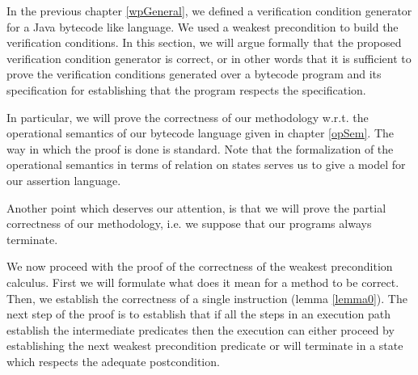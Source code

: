  In the previous chapter \ref{wpGeneral}, we defined a verification
 condition generator for a Java bytecode like language. We used a weakest precondition
 to build the verification conditions. In this section, we will argue formally that the
 proposed verification condition generator is correct, or in other words that it is sufficient
 to prove the verification conditions generated over a bytecode program and its specification 
 for establishing that the program respects the specification. 

 In particular, we will prove the correctness of our methodology w.r.t. the operational semantics of our bytecode language
 given in chapter \ref{opSem}. The way in which the proof is done is standard. Note that the formalization
 of the operational semantics in terms of relation on states serves us to give a model for our assertion
 language. 

 Another point which deserves our attention, is that we will prove the partial correctness of our methodology, i.e.
 we suppose that our programs always terminate.

 We now proceed with the proof of the correctness of the weakest precondition calculus.
 First we will formulate what does it mean for a method to be correct. Then, we establish the correctness
of a single instruction (lemma \ref{lemma0}). The next step of the proof  is to establish that if all the steps
in an execution path establish the intermediate predicates then the execution can either proceed by establishing
the next weakest precondition predicate or will terminate in a state which respects the adequate postcondition.
  



